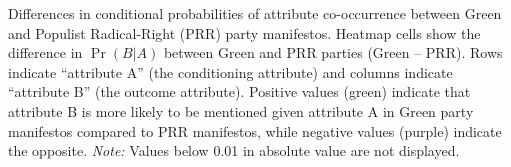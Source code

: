 Differences in conditional probabilities of attribute co-occurrence between Green and Populist Radical-Right (PRR) party manifestos. Heatmap cells show the difference in $\Pr(B|A)$ between Green and PRR parties (Green – PRR). Rows indicate ``attribute A'' (the conditioning attribute) and columns indicate ``attribute B'' (the outcome attribute). Positive values (green) indicate that attribute B is more likely to be mentioned given attribute A in Green party manifestos compared to PRR manifestos, while negative values (purple) indicate the opposite. \emph{Note:} Values below 0.01 in absolute value are not displayed.